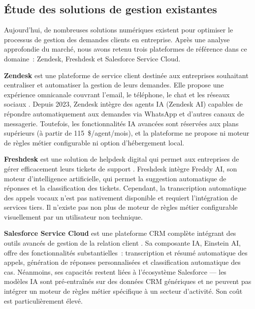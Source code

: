 
\subsection{\'{E}tude des solutions de gestion existantes}

Aujourd'hui, de nombreuses solutions num\'{e}riques existent pour optimiser le processus de gestion des demandes clients en entreprise. Apr\`{e}s une analyse approfondie du march\'{e}, nous avons retenu trois plateformes de r\'{e}f\'{e}rence dans ce domaine~: Zendesk, Freshdesk et Salesforce Service Cloud.

\indent \textbf{Zendesk} est une plateforme de service client destin\'{e}e aux entreprises souhaitant centraliser et automatiser la gestion de leurs demandes. Elle propose une exp\'{e}rience omnicanale couvrant l'email, le t\'{e}l\'{e}phone, le chat et les r\'{e}seaux sociaux \cite{zendesk}. Depuis 2023, Zendesk int\`{e}gre des agents IA (Zendesk AI) capables de r\'{e}pondre automatiquement aux demandes via WhatsApp et d'autres canaux de messagerie. Toutefois, les fonctionnalit\'{e}s IA avanc\'{e}es sont r\'{e}serv\'{e}es aux plans sup\'{e}rieurs (\`{a} partir de 115~\$/agent/mois), et la plateforme ne propose ni moteur de r\`{e}gles m\'{e}tier configurable ni option d'h\'{e}bergement local.

\indent \textbf{Freshdesk} est une solution de helpdesk digital qui permet aux entreprises de g\'{e}rer efficacement leurs tickets de support \cite{freshdesk}. Freshdesk int\`{e}gre Freddy AI, son moteur d'intelligence artificielle, qui permet la suggestion automatique de r\'{e}ponses et la classification des tickets. Cependant, la transcription automatique des appels vocaux n'est pas nativement disponible et requiert l'int\'{e}gration de services tiers. Il n'existe pas non plus de moteur de r\`{e}gles m\'{e}tier configurable visuellement par un utilisateur non technique.

\indent \textbf{Salesforce Service Cloud} est une plateforme CRM compl\`{e}te int\'{e}grant des outils avanc\'{e}s de gestion de la relation client \cite{salesforce}. Sa composante IA, Einstein AI, offre des fonctionnalit\'{e}s substantielles~: transcription et r\'{e}sum\'{e} automatique des appels, g\'{e}n\'{e}ration de r\'{e}ponses personnalis\'{e}es et classification automatique des cas. N\'{e}anmoins, ses capacit\'{e}s restent li\'{e}es \`{a} l'\'{e}cosyst\`{e}me Salesforce --- les mod\`{e}les IA sont pr\'{e}-entra\^{i}n\'{e}s sur des donn\'{e}es CRM g\'{e}n\'{e}riques et ne peuvent pas int\'{e}grer un moteur de r\`{e}gles m\'{e}tier sp\'{e}cifique \`{a} un secteur d'activit\'{e}. Son co\^{u}t est particuli\`{e}rement \'{e}lev\'{e}.

